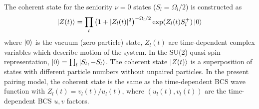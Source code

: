 \documentclass[%
superscriptaddress,
preprint,
showpacs,
nofootinbib,
amsmath,amssymb,
aps,
prc,
floatfix ]%
{revtex4-1}
\begin{document}
The coherent state for the seniority $\nu=0$ states
($S_l=\Omega_l/2$) is constructed as
\begin{equation}
	\ket{Z(t)} = \prod_{l} \left(1+|Z_l(t)|^2\right)^{-\Omega_l/2}
	\exp (Z_l(t) S_l^{+}) \ket{0}
 \label{coherent}
\end{equation}
where $\ket{0}$ is the vacuum (zero particle) state,
$Z_l(t)$ are time-dependent complex variables which describe
motion of the system. 
In the SU(2) quasi-spin representation,
$\ket{0}=\prod_l \ket{S_l,-S_l}$.
The coherent state $\ket{Z(t)}$ is a superposition of
states with different particle numbers
without unpaired particles.
In the present pairing model,
the coherent state is the same as the time-dependent BCS wave function
with $Z_l(t)=v_l(t)/u_l(t)$,
where $(u_l(t),v_l(t))$ are the time-dependent BCS $u,v$ factors.
\end{document}
